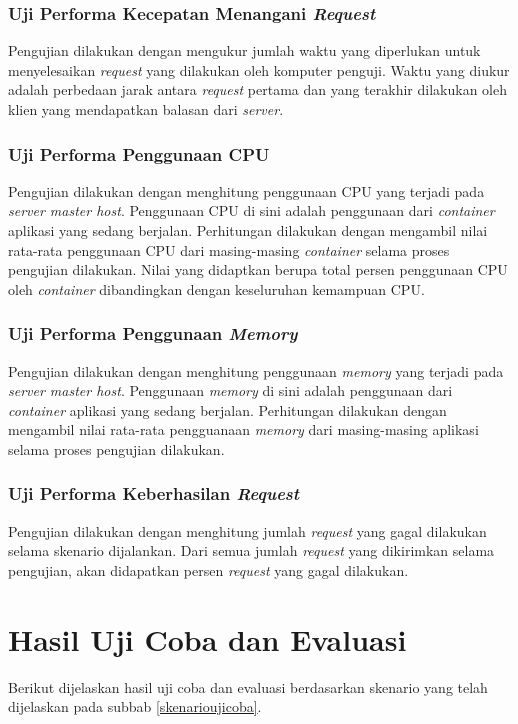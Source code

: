     	\subsubsection{Uji Performa Kecepatan Menangani \textit{Request}}
        	Pengujian dilakukan dengan mengukur jumlah waktu yang diperlukan untuk menyelesaikan \textit{request} yang dilakukan oleh komputer penguji. Waktu yang diukur adalah perbedaan jarak antara \textit{request} pertama dan yang terakhir dilakukan oleh klien yang mendapatkan balasan dari \textit{server}.
        \subsubsection{Uji Performa Penggunaan CPU}
        	Pengujian dilakukan dengan menghitung penggunaan CPU yang terjadi pada \textit{server master host}. Penggunaan CPU di sini adalah penggunaan dari \textit{container} aplikasi yang sedang berjalan. Perhitungan dilakukan dengan mengambil nilai rata-rata penggunaan CPU dari masing-masing \textit{container} selama proses pengujian dilakukan. Nilai yang didaptkan berupa total persen penggunaan CPU oleh \textit{container} dibandingkan dengan keseluruhan kemampuan CPU.
        \subsubsection{Uji Performa Penggunaan \textit{Memory}}
        	Pengujian dilakukan dengan menghitung penggunaan \textit{memory} yang terjadi pada \textit{server master host}. Penggunaan \textit{memory} di sini adalah penggunaan dari \textit{container} aplikasi yang sedang berjalan. Perhitungan dilakukan dengan mengambil nilai rata-rata pengguanaan \textit{memory} dari masing-masing aplikasi selama proses pengujian dilakukan.
        \subsubsection{Uji Performa Keberhasilan \textit{Request}}
        	Pengujian dilakukan dengan menghitung jumlah \textit{request} yang gagal dilakukan selama skenario dijalankan. Dari semua jumlah \textit{request} yang dikirimkan selama pengujian, akan didapatkan persen \textit{request} yang gagal dilakukan.
    
\section{Hasil Uji Coba dan Evaluasi}
	Berikut dijelaskan hasil uji coba dan evaluasi berdasarkan skenario yang telah dijelaskan pada subbab \ref{skenarioujicoba}.
    

